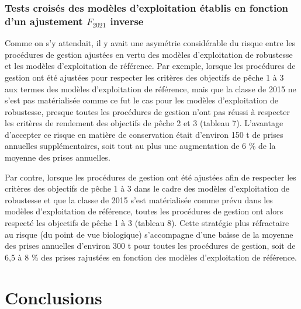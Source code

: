 \documentclass[11pt]{book}
\begin{document}
\hypertarget{tests-croisuxe9s-des-moduxe8les-dexploitation-uxe9tablis-en-fonction-dun-ajustement-f_2021-inverse}{%
\subsubsection{\texorpdfstring{Tests croisés des modèles d'exploitation établis en fonction d'un ajustement \(F_{2021}\) inverse}{Tests croisés des modèles d'exploitation établis en fonction d'un ajustement F\_\{2021\} inverse}}\label{tests-croisuxe9s-des-moduxe8les-dexploitation-uxe9tablis-en-fonction-dun-ajustement-f_2021-inverse}}

Comme on s'y attendait, il y avait une asymétrie considérable du risque entre les procédures de gestion ajustées en vertu des modèles d'exploitation de robustesse et les modèles d'exploitation de référence. Par exemple, lorsque les procédures de gestion ont été ajustées pour respecter les critères des objectifs de pêche 1 à 3 aux termes des modèles d'exploitation de référence, mais que la classe de 2015 ne s'est pas matérialisée comme ce fut le cas pour les modèles d'exploitation de robustesse, presque toutes les procédures de gestion n'ont pas réussi à respecter les critères de rendement des objectifs de pêche 2 et 3 (tableau 7). L'avantage d'accepter ce risque en matière de conservation était d'environ 150 t de prises annuelles supplémentaires, soit tout au plus une augmentation de 6 \% de la moyenne des prises annuelles.

Par contre, lorsque les procédures de gestion ont été ajustées afin de respecter les critères des objectifs de pêche 1 à 3 dans le cadre des modèles d'exploitation de robustesse et que la classe de 2015 s'est matérialisée comme prévu dans les modèles d'exploitation de référence, toutes les procédures de gestion ont alors respecté les objectifs de pêche 1 à 3 (tableau 8). Cette stratégie plus réfractaire au risque (du point de vue biologique) s'accompagne d'une baisse de la moyenne des prises annuelles d'environ 300 t pour toutes les procédures de gestion, soit de 6,5 à 8 \% des prises rajustées en fonction des modèles d'exploitation de référence.

\hypertarget{conclusions}{%
\section{Conclusions}\label{conclusions}}
\end{document}
